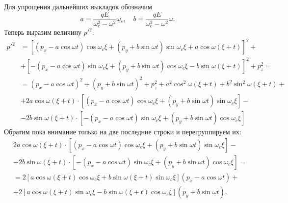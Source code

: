 Для упрощения дальнейших выкладок обозначим
\[
    a = \frac{qE}{\omega_c^2 - \omega^2}\omega_c,\quad
    b = \frac{qE}{\omega_c^2 - \omega^2}\omega.
\]
Теперь выразим величину \( {p'}^2 \):
\begin{align*}
    {p'}^2 & = \left[(p_x - a\cos\omega t)\cos\omega_c\xi +
               (p_y + b\sin\omega t)\sin\omega_c\xi +
               a\cos\omega(\xi+t)\right]^2 + \\
           & + \left[-(p_x - a\cos\omega t)\sin\omega_c\xi +
               (p_y + b\sin\omega t)\cos\omega_c\xi -
               b\sin\omega(\xi+t)\right]^2 + p_z^2 =\\
           & = (p_x - a\cos\omega t)^2 + (p_y + b\sin\omega t)^2 + p_z^2 +
                a^2\cos^2\omega(\xi+t) + b^2\sin^2\omega(\xi+t) +\\
           & + 2a\cos\omega(\xi+t)\cdot[(p_x - a\cos\omega t)\cos\omega_c\xi +
               (p_y + b\sin\omega t)\sin\omega_c\xi] -\\
           & - 2b\sin\omega(\xi+t)\cdot[-(p_x - a\cos\omega t)\sin\omega_c\xi +
               (p_y + b\sin\omega t)\cos\omega_c\xi]
\end{align*}
Обратим пока внимание только на две последние строки и перегруппируем их:
\begin{align*}
    & 2a\cos\omega(\xi+t)\cdot[(p_x - a\cos\omega t)\cos\omega_c\xi +
       (p_y + b\sin\omega t)\sin\omega_c\xi] -\\
    & - 2b\sin\omega(\xi+t)\cdot[-(p_x - a\cos\omega t)\sin\omega_c\xi +
       (p_y + b\sin\omega t)\cos\omega_c\xi] = \\
    & = 2[a\cos\omega(\xi+t)\cos\omega_c\xi + b\sin\omega(\xi+t)\sin\omega_c\xi]
       (p_x - a\cos\omega t) + \\
    & + 2[a\cos\omega(\xi+t)\sin\omega_c\xi - b\sin\omega(\xi+t)\cos\omega_c\xi]
       (p_y + b\sin\omega t).
\end{align*}
